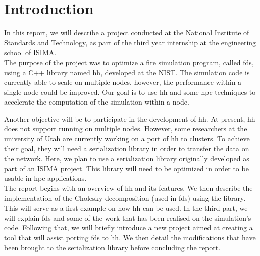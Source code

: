 
\setcounter{page}{1}
\clearpage{}
\pagestyle{fancy}
\section*{Introduction}

In this report, we will describe a project conducted at the National Institute
of Standards and Technology, as part of the third year internship at the
engineering school of ISIMA.\\

The purpose of the project was to optimize a fire simulation program, called
\gls{fds}, using a C++ library named \gls{hh}, developed at the NIST. The
simulation code is currently able to scale on multiple nodes, however, the
performance within a single node could be improved. Our goal is to use \gls{hh}
and some \gls{hpc} techniques to accelerate the computation of the simulation
within a node.

Another objective will be to participate in the development of \gls{hh}. At
present, \gls{hh} does not support running on multiple nodes. However, some
researchers at the university of Utah are currently working on a port of
\gls{hh} to clusters. To achieve their goal, they will need a serialization
library in order to transfer the data on the network. Here, we plan to use a
serialization library originally developed as part of an ISIMA project. This
library will need to be optimized in order to be usable in \gls{hpc}
applications.\\

The report begins with an overview of \gls{hh} and its features. We then
describe the implementation of the Cholesky decomposition (used in \gls{fds})
using the library. This will serve as a first example on how \gls{hh} can be
used. In the third part, we will explain \gls{fds} and some of the work that has
been realised on the simulation's code. Following that, we will briefly
introduce a new project aimed at creating a tool that will assist porting
\gls{fds} to \gls{hh}. We then detail the modifications that have been brought
to the serialization library before concluding the report.

\clearpage{}
